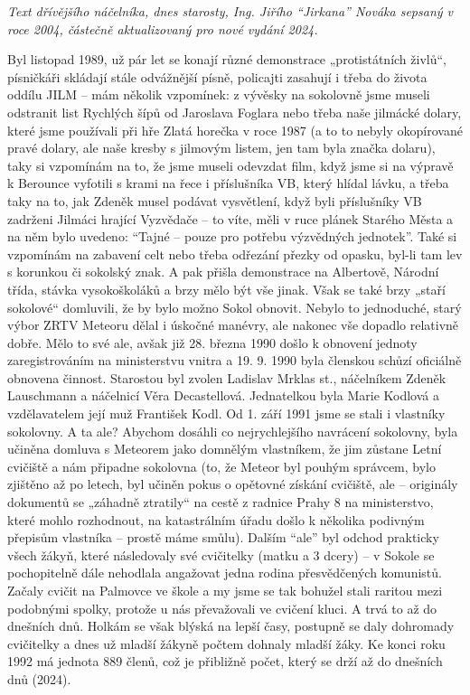 \emph{Text dřívějšího náčelníka, dnes starosty, Ing. Jiřího ``Jirkana''
Nováka sepsaný v roce 2004, částečně aktualizovaný pro nové vydání
2024.}

Byl listopad 1989, už pár let se konají různé demonstrace „protistátních
živlů``, písničkáři skládají stále odvážnější písně, policajti zasahují
i třeba do života oddílu JILM -- mám několik vzpomínek: z vývěsky na
sokolovně jsme museli odstranit list Rychlých šípů od Jaroslava Foglara
nebo třeba naše jilmácké dolary, které jsme používali při hře Zlatá
horečka v roce 1987 (a to to nebyly okopírované pravé dolary, ale naše
kresby s jilmovým listem, jen tam byla značka dolaru), taky si vzpomínám
na to, že jsme museli odevzdat film, když jsme si na výpravě k Berounce
vyfotili s krami na řece i příslušníka VB, který hlídal lávku, a třeba
taky na to, jak Zdeněk musel podávat vysvětlení, když byli příslušníky
VB zadrženi Jilmáci hrající Vyzvědače -- to víte, měli v ruce plánek
Starého Města a na něm bylo uvedeno: ``Tajné -- pouze pro potřebu
výzvědných jednotek''. Také si vzpomínám na zabavení celt nebo třeba
odřezání přezky od opasku, byl-li tam lev s korunkou či sokolský znak. A
pak přišla demonstrace na Albertově, Národní třída, stávka vysokoškoláků
a brzy mělo být vše jinak. Však se také brzy „staří sokolové``
domluvili, že by bylo možno Sokol obnovit. Nebylo to jednoduché, starý
výbor ZRTV Meteoru dělal i úskočné manévry, ale nakonec vše dopadlo
relativně dobře. Mělo to své ale, avšak již 28. března 1990 došlo k
obnovení jednoty zaregistrováním na ministerstvu vnitra a 19. 9. 1990
byla členskou schůzí oficiálně obnovena činnost. Starostou byl zvolen
Ladislav Mrklas st., náčelníkem Zdeněk Lauschmann a náčelnicí Věra
Decastellová. Jednatelkou byla Marie Kodlová a vzdělavatelem její muž
František Kodl. Od 1. září 1991 jsme se stali i vlastníky sokolovny. A
ta ale? Abychom dosáhli co nejrychlejšího navrácení sokolovny, byla
učiněna domluva s Meteorem jako domnělým vlastníkem, že jim zůstane
Letní cvičiště a nám připadne sokolovna (to, že Meteor byl pouhým
správcem, bylo zjištěno až po letech, byl učiněn pokus o opětovné
získání cvičiště, ale -- originály dokumentů se „záhadně ztratily`` na
cestě z radnice Prahy 8 na ministerstvo, které mohlo rozhodnout, na
katastrálním úřadu došlo k několika podivným přepisům vlastníka --
prostě máme smůlu). Dalším ``ale'' byl odchod prakticky všech žákyň,
které následovaly své cvičitelky (matku a 3 dcery) -- v Sokole se
pochopitelně dále nehodlala angažovat jedna rodina přesvědčených
komunistů. Začaly cvičit na Palmovce ve škole a my jsme se tak bohužel
stali raritou mezi podobnými spolky, protože u nás převažovali ve
cvičení kluci. A trvá to až do dnešních dnů. Holkám se však blýská na
lepší časy, postupně se daly dohromady cvičitelky a dnes už mladší
žákyně počtem dohnaly mladší žáky. Ke konci roku 1992 má jednota 889
členů, což je přibližně počet, který se drží až do dnešních dnů (2024).

